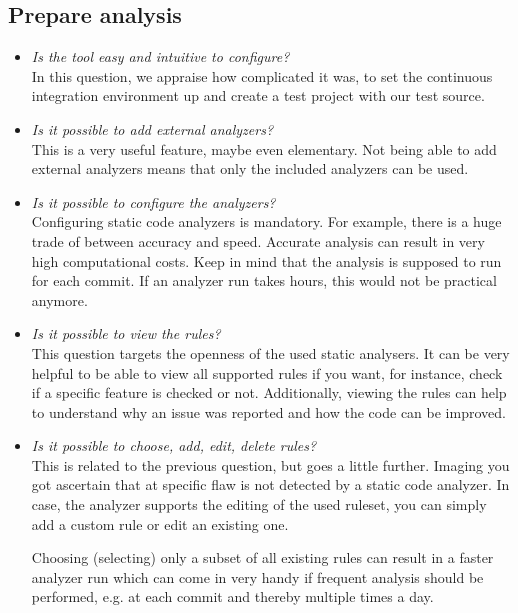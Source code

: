 \documentclass[conference]{IEEEtran}
\begin{document}
\subsection{Prepare analysis}
\begin{itemize}
	\item \textit{Is the tool easy and intuitive to configure?} \\
	In this question, we appraise how complicated it was, to set the continuous integration environment up and create a test project with our test source.
	
	\item \textit{Is it possible to add external analyzers?} \\
	This is a very useful feature, maybe even elementary. Not being able to add external analyzers means that only the included analyzers can be used.
	
	\item \textit{Is it possible to configure the analyzers?} \\
	Configuring static code analyzers is mandatory. For example, there is a huge trade of between accuracy and speed. Accurate analysis can result in very high computational costs. Keep in mind that the analysis is supposed to run for each commit. If an analyzer run takes hours, this would not be practical anymore.
	
	\item \textit{Is it possible to view the rules?} \\
	This question targets the openness of the used static analysers. It can be very helpful to be able to view all supported rules if you want, for instance, check if a specific feature is checked or not. Additionally, viewing the rules can help to understand why an issue was reported and how the code can be improved.
	
	\item \textit{Is it possible to choose, add, edit, delete rules?} \\
	This is related to the previous question, but goes a little further. Imaging you got ascertain that at specific flaw is not detected by a static code analyzer. In case, the analyzer supports the editing of the used ruleset, you can simply add a custom rule or edit an existing one.
	
	Choosing (selecting) only a subset of all existing rules can result in a faster analyzer run which can come in very handy if frequent analysis should be performed, e.g. at each commit and thereby multiple times a day.
\end{itemize}
\end{document}
